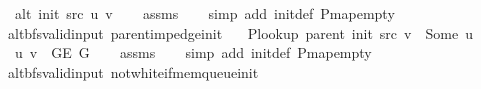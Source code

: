 \begin{isabellebody}
\ \ \ {\isachardoublequoteopen}alt\ {\isacharparenleft}{\kern0pt}init\ src{\isacharparenright}{\kern0pt}\ u\ v{\isachardoublequoteclose}%
\endisataginvisible
{\isafoldinvisible}%
%
\isadeliminvisible
\isanewline
%
\endisadeliminvisible
%
\isadelimproof
\ \ %
\endisadelimproof
%
\isatagproof
{}\isamarkupfalse%
\ assms\isanewline
\ \ \isamarkupfalse%
\ {\isacharparenleft}{\kern0pt}simp\ add{\isacharcolon}{\kern0pt}\ init{\isacharunderscore}{\kern0pt}def\ P{\isachardot}{\kern0pt}map{\isacharunderscore}{\kern0pt}empty{\isacharparenright}{\kern0pt}%
\endisatagproof
{\isafoldproof}%
%
\isadelimproof
\isanewline
%
\endisadelimproof
%
\isadeliminvisible
\isanewline
%
\endisadeliminvisible
%
\isataginvisible
{}\isamarkupfalse%
\ {\isacharparenleft}{\kern0pt}\ alt{\isacharunderscore}{\kern0pt}bfs{\isacharunderscore}{\kern0pt}valid{\isacharunderscore}{\kern0pt}input{\isacharparenright}{\kern0pt}\ parent{\isacharunderscore}{\kern0pt}imp{\isacharunderscore}{\kern0pt}edge{\isacharunderscore}{\kern0pt}init{\isacharcolon}{\kern0pt}\isanewline
\ \ \ {\isachardoublequoteopen}P{\isacharunderscore}{\kern0pt}lookup\ {\isacharparenleft}{\kern0pt}parent\ {\isacharparenleft}{\kern0pt}init\ src{\isacharparenright}{\kern0pt}{\isacharparenright}{\kern0pt}\ v\ {\isacharequal}{\kern0pt}\ Some\ u{\isachardoublequoteclose}\isanewline
\ \ \ {\isachardoublequoteopen}{\isacharbraceleft}{\kern0pt}u{\isacharcomma}{\kern0pt}\ v{\isacharbraceright}{\kern0pt}\ {\isasymin}\ G{\isachardot}{\kern0pt}E\ G{\isachardoublequoteclose}%
\endisataginvisible
{\isafoldinvisible}%
%
\isadeliminvisible
\isanewline
%
\endisadeliminvisible
%
\isadelimproof
\ \ %
\endisadelimproof
%
\isatagproof
{}\isamarkupfalse%
\ assms\isanewline
\ \ \isamarkupfalse%
\ {\isacharparenleft}{\kern0pt}simp\ add{\isacharcolon}{\kern0pt}\ init{\isacharunderscore}{\kern0pt}def\ P{\isachardot}{\kern0pt}map{\isacharunderscore}{\kern0pt}empty{\isacharparenright}{\kern0pt}%
\endisatagproof
{\isafoldproof}%
%
\isadelimproof
\isanewline
%
\endisadelimproof
%
\isadeliminvisible
\isanewline
%
\endisadeliminvisible
%
\isataginvisible
{}\isamarkupfalse%
\ {\isacharparenleft}{\kern0pt}\ alt{\isacharunderscore}{\kern0pt}bfs{\isacharunderscore}{\kern0pt}valid{\isacharunderscore}{\kern0pt}input{\isacharparenright}{\kern0pt}\ not{\isacharunderscore}{\kern0pt}white{\isacharunderscore}{\kern0pt}if{\isacharunderscore}{\kern0pt}mem{\isacharunderscore}{\kern0pt}queue{\isacharunderscore}{\kern0pt}init{\isacharcolon}{\kern0pt}\isanewline

\end{isabellebody}
